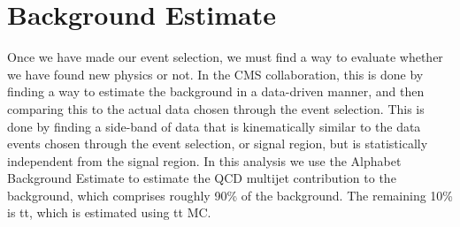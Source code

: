 \chapter{Background Estimate}\label{Sec:Bkg}

Once we have made our event selection, we must find a way to evaluate whether we have found new physics or not. In the CMS collaboration, this is done by finding a way to estimate the background in a data-driven manner, and then comparing this to the actual data chosen through the event selection. This is done by finding a side-band of data that is kinematically similar to the data events chosen through the event selection, or signal region, but is statistically independent from the signal region. In this analysis we use the Alphabet Background Estimate to estimate the QCD multijet contribution to the background, which comprises roughly 90\% of the background. The remaining 10\% is tt, which is estimated using tt MC.

